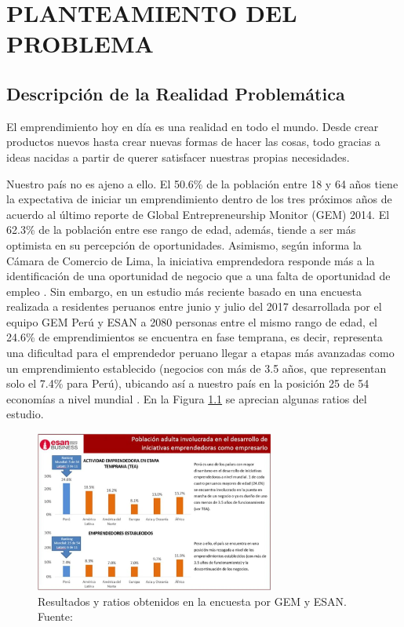 \chapter{PLANTEAMIENTO DEL PROBLEMA}
\section{Descripción de la Realidad Problemática}

El emprendimiento hoy en día es una realidad en todo el mundo. Desde crear productos nuevos hasta crear nuevas formas de hacer las cosas, todo gracias a ideas nacidas a partir de querer satisfacer nuestras propias necesidades.

Nuestro país no es ajeno a ello. El 50.6\% de la población entre 18 y 64 años tiene la expectativa de iniciar un emprendimiento dentro de los tres próximos años de acuerdo al último reporte de Global Entrepreneurship Monitor (GEM) 2014. El 62.3\% de la población entre ese rango de edad, además, tiende a ser más optimista en su percepción de oportunidades. Asimismo, según informa la Cámara de Comercio de Lima, la iniciativa emprendedora responde más a la identificación de una oportunidad de negocio que a una falta de oportunidad de empleo \parencite{cr_gestion2015emprendper}. Sin embargo, en un estudio más reciente basado en una encuesta realizada a residentes peruanos entre junio y julio del 2017 desarrollada por el equipo GEM Perú y ESAN a 2080 personas entre el mismo rango de edad, el 24.6\% de emprendimientos se encuentra en fase temprana, es decir, representa una dificultad para el emprendedor peruano llegar a etapas más avanzadas como un emprendimiento establecido (negocios con más de 3.5 años, que representan solo el 7.4\% para Perú), ubicando así a nuestro país en la posición 25 de 54 economías a nivel mundial \parencite{cr_gestion2018emprend}. En la Figura \ref{1:fig} se aprecian algunas ratios del estudio. %

\begin{figure}[h]
	\begin{center}
		\includegraphics[width=0.7\textwidth]{1/figures/cuadro_esan.jpg}
		\caption{Resultados y ratios obtenidos en la encuesta por GEM y ESAN. Fuente: \cite{cr_gestion2018emprend}}
		\label{1:fig}
	\end{center}
\end{figure}

